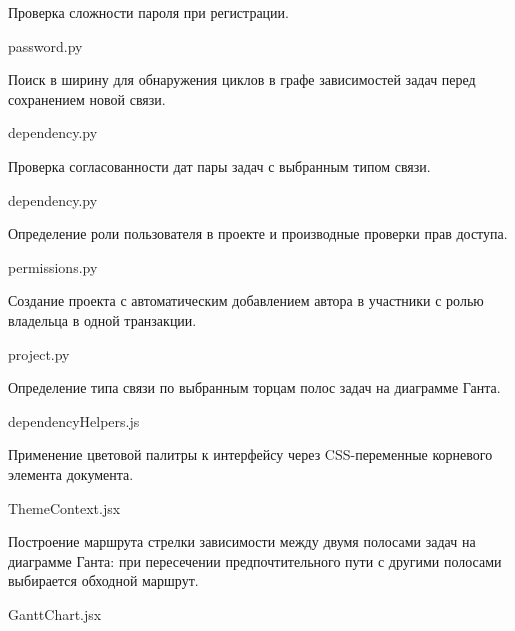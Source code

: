 
\newcommand{\codefrag}[2]{\par\smallskip #1\par\noindent #2\nopagebreak\par\nopagebreak}

\codefrag{Проверка сложности пароля при регистрации.}{password.py}


\codefrag{Поиск в ширину для обнаружения циклов в графе зависимостей задач перед сохранением новой связи.}{dependency.py}


\codefrag{Проверка согласованности дат пары задач с выбранным типом связи.}{dependency.py}


\codefrag{Определение роли пользователя в проекте и производные проверки прав доступа.}{permissions.py}


\codefrag{Создание проекта с автоматическим добавлением автора в участники с ролью владельца в одной транзакции.}{project.py}


\codefrag{Определение типа связи по выбранным торцам полос задач на диаграмме Ганта.}{dependencyHelpers.js}


\codefrag{Применение цветовой палитры к интерфейсу через CSS-переменные корневого элемента документа.}{ThemeContext.jsx}


\codefrag{Построение маршрута стрелки зависимости между двумя полосами задач на диаграмме Ганта: при пересечении предпочтительного пути с другими полосами выбирается обходной маршрут.}{GanttChart.jsx}


